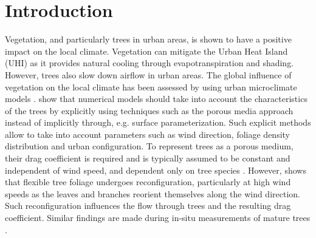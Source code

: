 
\section{Introduction}

Vegetation, and particularly trees in urban areas, is shown to have a positive impact on the local climate. Vegetation can mitigate the Urban Heat Island (UHI) as it provides natural cooling through evapotranspiration and shading. However, trees also slow down airflow in urban areas. The global influence of vegetation on the local climate has been assessed by using urban microclimate models \citep{Bruse1998,Robitu2006}. \cite{HefnySalim2015} show that numerical models should take into account the characteristics of the trees by explicitly using techniques such as the porous media approach instead of implicitly through, e.g. surface parameterization. Such explicit methods allow to take into account parameters such as wind direction, foliage density distribution and urban configuration. To represent trees as a porous medium, their drag coefficient is required and is typically assumed to be constant and independent of wind speed, and dependent only on tree species \citep{Wilson1977}. However, \cite{DeLangre2012} shows that flexible tree foliage undergoes reconfiguration, particularly at high wind speeds as the leaves and branches reorient themselves along the wind direction. Such reconfiguration influences the flow through trees and the resulting drag coefficient. Similar findings are made during in-situ measurements of mature trees \citep{Grant1998,Kane2006,Koizumi2016}.

